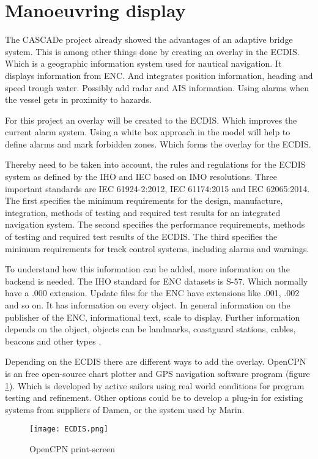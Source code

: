 \section{Manoeuvring display}
The CASCADe project already showed the advantages of an adaptive bridge system. This is among other things done by creating an overlay in the \ac{ECDIS}. Which is a geographic information system used for nautical navigation. It displays information from \ac{ENC}. And integrates position information, heading and speed trough water. Possibly add radar and \ac{AIS} information. Using alarms when the vessel gets in proximity to hazards. 

For this project an overlay will be created to the \ac{ECDIS}. Which improves the current alarm system. Using a white box approach in the model will help to define alarms and mark forbidden zones. Which forms the overlay for the \ac{ECDIS}.

Thereby need to be taken into account, the rules and regulations for the \ac{ECDIS} system as defined by the \ac{IHO} and \ac{IEC} based on \ac{IMO} resolutions. Three  important standards are IEC 61924-2:2012, IEC 61174:2015 and IEC 62065:2014.
The first specifies the minimum requirements for the design, manufacture, integration, methods of testing and required test results for an integrated navigation system.
The second specifies the performance requirements, methods of testing and required test results of the \ac{ECDIS}.
The third specifies the minimum requirements for track control systems, including alarms and warnings.

To understand how this information can be added, more information on the backend is needed. The \ac{IHO} standard for \ac{ENC} datasets is S-57. Which normally have a .000 extension. Update files for the \ac{ENC} have extensions like .001, .002 and so on. It has information on every object. In general information on the publisher of the \ac{ENC}, informational text, scale to display. Further information depends on the object, objects can be landmarks, coastguard stations, cables, beacons and other types \cite{IHO2017}. 

Depending on the \ac{ECDIS} there are different ways to add the overlay. OpenCPN is an free open-source chart plotter and GPS navigation software program (figure \ref{fig:ECDIS}). Which is developed by active sailors using real world conditions for program testing and refinement.
Other options could be to develop a plug-in for existing systems from suppliers of Damen, or the system used by Marin.

\begin{figure}[H]
	\centering
	\texttt{[image: ECDIS.png]}
	\caption{OpenCPN print-screen}
	\label{fig:ECDIS}
\end{figure}



